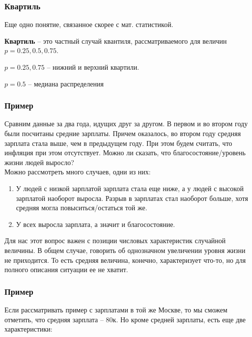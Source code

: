 \documentclass{article}
\begin{document}
\subsubsection{Квартиль}

Еще одно понятие, связанное скорее с мат. статистикой. 

\textbf{Квартиль} -- это частный случай квантиля, рассматриваемого для величин $p = 0.25, 0.5, 0.75$.

$p = 0.25, 0.75$ -- нижний и верхний квартили.

$p = 0.5$ -- медиана распределения

\subsubsection{Пример}

Сравним данные за два года, идущих друг за другом. В первом и во втором году были посчитаны средние зарплаты. Причем оказалось, во втором году средняя зарплата стала выше, чем в предыдущем году. При этом будем считать, что инфляция при этом отсутствует. Можно ли сказать, что благосостояние/уровень жизни людей выросло?
\\

Можно рассмотреть много случаев, одни из них:

\begin{enumerate}
\item У людей с низкой зарплатой зарплата стала еще ниже, а у людей с высокой зарплатой наоборот выросла. Разрыв в зарплатах стал наоборот больше, хотя средняя могла повыситься/остаться той же.

\item У всех выросла зарплата, а значит и благосостояние.
\end{enumerate}

Для нас этот вопрос важен с позиции числовых характеристик случайной величины. В общем случае, говорить об однозначном увеличении уровня жизни не приходится. То есть средняя величина, конечно, характеризует что-то, но для полного описания ситуации ее не хватит.

\subsubsection{Пример}

Если рассматривать пример с зарплатами в той же Москве, то мы сможем отметить, что средняя зарплата -- 80к. Но кроме средней зарплаты, есть еще две характеристики:
\end{document}

